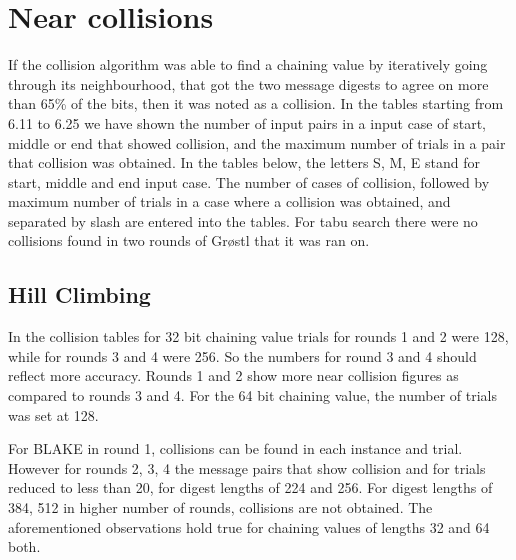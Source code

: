 \section{Near collisions}

If the collision algorithm was able to find a chaining value by iteratively going through its neighbourhood, that got
the two message digests to agree on more than 65\% of the bits, then it was noted as a collision. In the tables
starting from 6.11 to 6.25 we have shown the number of input pairs in a input case of start, middle or end that
showed collision, and the maximum number of trials in a pair that collision was obtained. In the tables below, the
letters S, M, E stand for start, middle and end input case. The number of cases of collision, followed by maximum number
of trials in a case where a collision was obtained, and separated by slash are entered into the tables. For tabu search
there were no collisions found in two rounds of Gr{\o}stl that it was ran on.

\subsection{Hill Climbing}

In the collision tables for 32 bit chaining value trials for rounds 1 and 2 were 128, while for rounds 3 and 4 were 256.
So the numbers for round 3 and 4 should reflect more accuracy. Rounds 1 and 2 show more near collision figures
as compared to rounds 3 and 4. For the 64 bit chaining value, the number of trials was set at 128.

For BLAKE in round 1, collisions can be found in each instance and trial. However for rounds 2, 3, 4 the message pairs
that show collision and for trials reduced to less than 20, for digest lengths of 224 and 256. For digest lengths of
384, 512 in higher number of rounds, collisions are not obtained. The aforementioned observations hold true for
chaining values of lengths 32 and 64 both.

